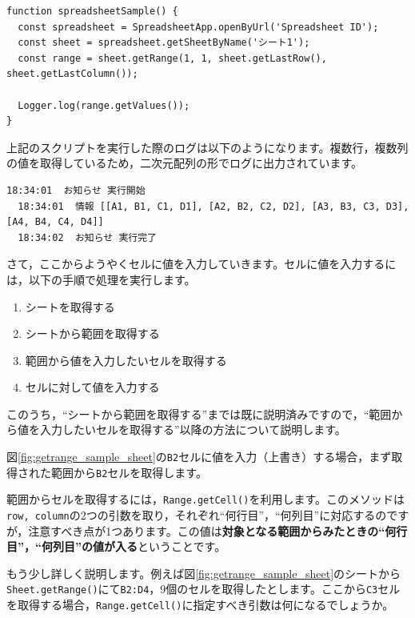 \documentclass[uplatex,a4j]{jsarticle}
\begin{document}
\begin{lstlisting}[basicstyle=\ttfamily\footnotesize,frame=single,caption=Sheet.getRangeで特定の範囲を取得する]
function spreadsheetSample() {
  const spreadsheet = SpreadsheetApp.openByUrl('Spreadsheet ID');
  const sheet = spreadsheet.getSheetByName('シート1');
  const range = sheet.getRange(1, 1, sheet.getLastRow(), sheet.getLastColumn());
  
  Logger.log(range.getValues());
}
\end{lstlisting}

上記のスクリプトを実行した際のログは以下のようになります。複数行，複数列の値を取得しているため，二次元配列の形でログに出力されています。

\begin{lstlisting}[basicstyle=\ttfamily\footnotesize,frame=single,caption=Sheet.getRange実行ログ例]
  18:34:01	お知らせ 実行開始
  18:34:01	情報 [[A1, B1, C1, D1], [A2, B2, C2, D2], [A3, B3, C3, D3], [A4, B4, C4, D4]]
  18:34:02	お知らせ 実行完了
  \end{lstlisting}

さて，ここからようやくセルに値を入力していきます。セルに値を入力するには，以下の手順で処理を実行します。

\begin{enumerate}
  \item シートを取得する
  \item シートから範囲を取得する
  \item 範囲から値を入力したいセルを取得する
  \item セルに対して値を入力する
\end{enumerate}

このうち，``シートから範囲を取得する''までは既に説明済みですので，``範囲から値を入力したいセルを取得する''以降の方法について説明します。

図\ref{fig:getrange_sample_sheet}の\verb|B2|セルに値を入力（上書き）する場合，まず取得された範囲から\verb|B2|セルを取得します。

範囲からセルを取得するには，\verb|Range.getCell()|を利用します。このメソッドは\verb|row, column|の2つの引数を取り，それぞれ``何行目''，``何列目''に対応するのですが，注意すべき点が1つあります。この値は\textbf{対象となる範囲からみたときの``何行目''，``何列目''の値が入る}ということです。

もう少し詳しく説明します。例えば図\ref{fig:getrange_sample_sheet}のシートから\verb|Sheet.getRange()|にて\verb|B2:D4|，9個のセルを取得したとします。ここから\verb|C3|セルを取得する場合，\verb|Range.getCell()|に指定すべき引数は何になるでしょうか。
\end{document}
